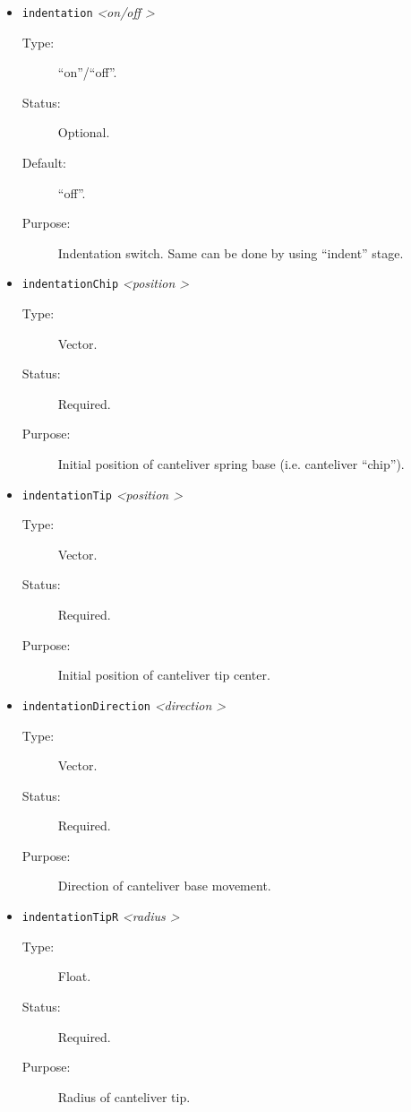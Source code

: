 \documentclass[a4paper]{article}
\begin{document}
\begin{itemize}

\item \texttt{indentation} \textit{\textless on/off \textgreater}
\begin{description}
\item[Type:] ``on''/``off''.
\item[Status:] Optional.
\item[Default:] ``off''.
\item[Purpose:] Indentation switch. Same can be done by using ``indent'' stage.
\end{description}

\item \texttt{indentationChip} \textit{\textless position \textgreater}
\begin{description}
\item[Type:] Vector.
\item[Status:] Required.
\item[Purpose:] Initial position of canteliver spring base (i.e. canteliver ``chip'').
\end{description}

\item \texttt{indentationTip} \textit{\textless position \textgreater}
\begin{description}
\item[Type:] Vector.
\item[Status:] Required.
\item[Purpose:] Initial position of canteliver tip center.
\end{description}

\item \texttt{indentationDirection} \textit{\textless direction \textgreater}
\begin{description}
\item[Type:] Vector.
\item[Status:] Required.
\item[Purpose:] Direction of canteliver base movement.
\end{description}

\item \texttt{indentationTipR} \textit{\textless radius \textgreater}
\begin{description}
\item[Type:] Float.
\item[Status:] Required.
\item[Purpose:] Radius of canteliver tip.
\end{description}


\end{itemize}
\end{document}
